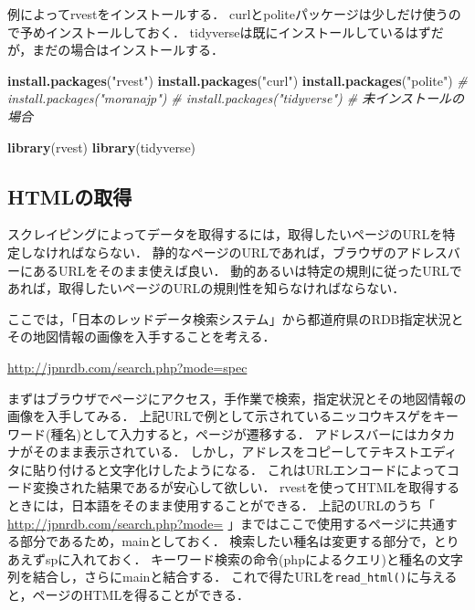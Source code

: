 \documentclass[
]{article}
\newenvironment{Shaded}{\begin{snugshade}}{\end{snugshade}}
\newcommand{\CommentTok}[1]{\textcolor[rgb]{0.56,0.35,0.01}{\textit{#1}}}
\newcommand{\FunctionTok}[1]{\textcolor[rgb]{0.13,0.29,0.53}{\textbf{#1}}}
\newcommand{\NormalTok}[1]{#1}
\newcommand{\StringTok}[1]{\textcolor[rgb]{0.31,0.60,0.02}{#1}}
\begin{document}
例によってrvestをインストールする．
curlとpoliteパッケージは少しだけ使うので予めインストールしておく．
tidyverseは既にインストールしているはずだが，まだの場合はインストールする．

\begin{Shaded}
\begin{Highlighting}[]
\FunctionTok{install.packages}\NormalTok{(}\StringTok{"rvest"}\NormalTok{)}
\FunctionTok{install.packages}\NormalTok{(}\StringTok{"curl"}\NormalTok{)}
\FunctionTok{install.packages}\NormalTok{(}\StringTok{"polite"}\NormalTok{)}
  \CommentTok{\# install.packages("moranajp")}
  \CommentTok{\# install.packages("tidyverse") \# 未インストールの場合}
\end{Highlighting}
\end{Shaded}

\begin{Shaded}
\begin{Highlighting}[]
\FunctionTok{library}\NormalTok{(rvest)}
\FunctionTok{library}\NormalTok{(tidyverse)}
\end{Highlighting}
\end{Shaded}

\hypertarget{htmlux306eux53d6ux5f97}{%
\subsection{HTMLの取得}\label{htmlux306eux53d6ux5f97}}

スクレイピングによってデータを取得するには，取得したいページのURLを特定しなければならない．
静的なページのURLであれば，ブラウザのアドレスバーにあるURLをそのまま使えば良い．
動的あるいは特定の規則に従ったURLであれば，取得したいページのURLの規則性を知らなければならない．

ここでは，「日本のレッドデータ検索システム」から都道府県のRDB指定状況とその地図情報の画像を入手することを考える．

\url{http://jpnrdb.com/search.php?mode=spec}

まずはブラウザでページにアクセス，手作業で検索，指定状況とその地図情報の画像を入手してみる．
上記URLで例として示されているニッコウキスゲをキーワード(種名)として入力すると，ページが遷移する．
アドレスバーにはカタカナがそのまま表示されている．
しかし，アドレスをコピーしてテキストエディタに貼り付けると文字化けしたようになる．
これはURLエンコードによってコード変換された結果であるが安心して欲しい．
rvestを使ってHTMLを取得するときには，日本語をそのまま使用することができる．
上記のURLのうち「 \url{http://jpnrdb.com/search.php?mode=} 」まではここで使用するページに共通する部分であるため，mainとしておく．
検索したい種名は変更する部分で，とりあえずspに入れておく．
キーワード検索の命令(phpによるクエリ)と種名の文字列を結合し，さらにmainと結合する．
これで得たURLを\texttt{read\_html()}に与えると，ページのHTMLを得ることができる．
\end{document}

